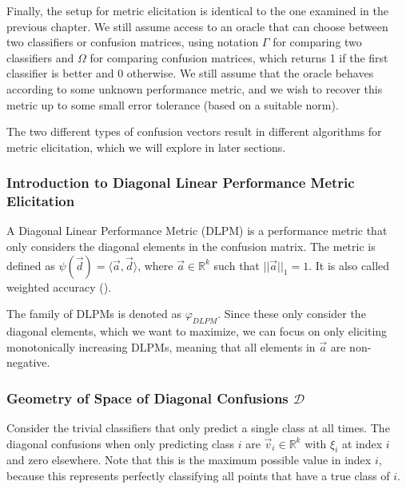\documentclass[
  letterpaper,
  numbers=noenddot,
  DIV=11]{scrreprt}
\theoremstyle{definition}
\theoremstyle{plain}
\theoremstyle{plain}
\theoremstyle{remark}
\begin{document}
Finally, the setup for metric elicitation is identical to the one
examined in the previous chapter. We still assume access to an oracle
that can choose between two classifiers or confusion matrices, using
notation \(\Gamma\) for comparing two classifiers and \(\Omega\) for
comparing confusion matrices, which returns 1 if the first classifier is
better and 0 otherwise. We still assume that the oracle behaves
according to some unknown performance metric, and we wish to recover
this metric up to some small error tolerance (based on a suitable norm).

The two different types of confusion vectors result in different
algorithms for metric elicitation, which we will explore in later
sections.

\subsubsection*{Introduction to Diagonal Linear Performance Metric
Elicitation}\label{introduction-to-diagonal-linear-performance-metric-elicitation}

A Diagonal Linear Performance Metric (DLPM) is a performance metric that
only considers the diagonal elements in the confusion matrix. The metric
is defined as \(\psi(\vec{d}) = \langle \vec{a}, \vec{d} \rangle\),
where \(\vec{a} \in \mathbb{R}^k\) such that \(||\vec{a}||_1 = 1\). It
is also called weighted accuracy
().

The family of DLPMs is denoted as \(\varphi_{DLPM}\). Since these only
consider the diagonal elements, which we want to maximize, we can focus
on only eliciting monotonically increasing DLPMs, meaning that all
elements in \(\vec{a}\) are non-negative.

\subsubsection*{\texorpdfstring{Geometry of Space of Diagonal Confusions
\(\mathcal{D}\)}{Geometry of Space of Diagonal Confusions \textbackslash mathcal\{D\}}}\label{geometry-of-space-of-diagonal-confusions-mathcald}

Consider the trivial classifiers that only predict a single class at all
times. The diagonal confusions when only predicting class \(i\) are
\(\vec{v}_i \in \mathbb{R}^k\) with \(\xi_i\) at index \(i\) and zero
elsewhere. Note that this is the maximum possible value in index \(i\),
because this represents perfectly classifying all points that have a
true class of \(i\).
\end{document}
